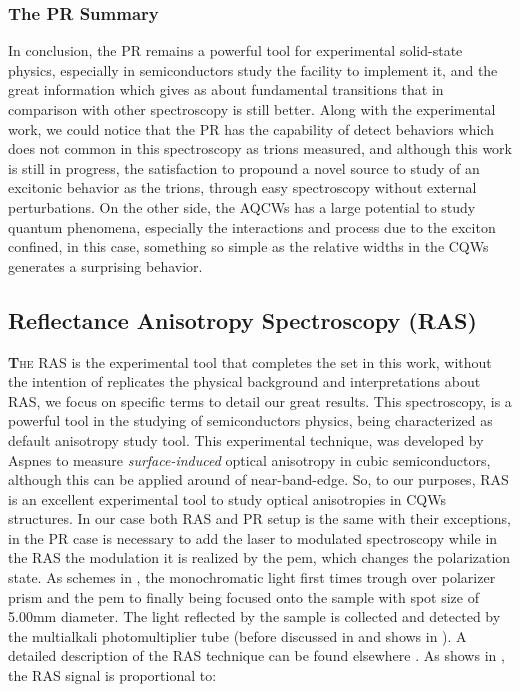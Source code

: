  \subsubsection{The PR Summary}
 \label{subsubsec:chapter-3-ps-conclusions}
 \vspace{-10mm}
 In conclusion, the PR remains a powerful tool for experimental solid-state physics, especially in semiconductors study the facility to implement it, and the great information which gives as about fundamental transitions that in comparison with other spectroscopy is still better. Along with the experimental work, we could notice that the PR has the capability of detect behaviors which does not common in this spectroscopy as trions measured, and although this work is still in progress, the satisfaction to propound a novel source to study of an excitonic behavior as the trions,  through easy spectroscopy without external perturbations.  On the other side, the AQCWs has a large potential to study quantum phenomena, especially the interactions and process due to the exciton confined, in this case, something so simple as the relative widths in the CQWs generates a surprising behavior. 



\subsection{Reflectance Anisotropy Spectroscopy (RAS)}
\label{subsec:chapter-3-ras}
 \vspace{-10mm}
\lettrine[lines=3, lraise=.1, nindent=0mm, slope=0mm]{\textbf{T}}{he \gls{RAS}} is the experimental tool that completes the set in this work, without the intention of replicates the physical background and interpretations about RAS, we focus on specific terms to detail our great results.  This spectroscopy, is a  powerful tool in the studying of semiconductors physics, being characterized as default anisotropy study tool.  This experimental technique, was developed by Aspnes\cite{aspnes1973surface,aspnes1985anisotropies, aspnes1985above} to measure \emph{surface-induced} optical anisotropy in cubic semiconductors, although this can be applied around of near-band-edge\cite{wei1995theory}. So, to our purposes, \gls{RAS} is an excellent experimental tool to study optical anisotropies in CQWs structures. In our case both \gls{RAS} and \gls{PR} setup is the same with their exceptions, in the \gls{PR} case is necessary to add the laser to modulated spectroscopy while in the \gls{RAS} the modulation it is realized by the \gls{pem}, which changes the polarization state. As schemes in , the monochromatic light first times trough over polarizer prism and the \gls{pem} to finally being focused onto the sample with spot size of 5.00mm diameter. The light reflected by the sample is collected and detected by the multialkali photomultiplier tube (before discussed in  and shows in ). A detailed description of the RAS technique can be found elsewhere \cite{lflm1993spectrometer}. As shows in , the RAS signal is proportional to: 

